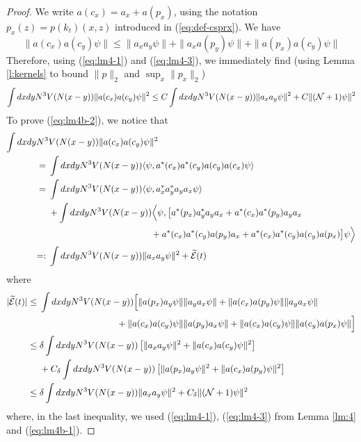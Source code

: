 \documentclass[11pt,a4paper,DIV11]{scrartcl}	%
\newcommand{\wt}{\widetilde}
\newcommand{\cE}{{\cal E}}
\newcommand{\cN}{{\cal N}}
\begin{document}
\begin{proof}
We write $a (c_x) = a_x + a (p_x)$, using the notation $p_x (z) = p (k_t) (x,z)$ introduced in (\ref{eq:def-csprx}). We have
\[ \| a (c_x) a (c_y) \psi \| \leq \| a_x a_y \psi \| + \| a_x a (p_y) \psi \| + \| a (p_x) a (c_y) \psi \| \] 
Therefore, using (\ref{eq:lm4-1}) and (\ref{eq:lm4-3}), we immediately find (using Lemma \ref{l:kernels} to bound $\| p \|_2$ and $\sup_x \| p_x \|_2$)
\[ \int dx dy N^3 V(N(x-y)) \| a(c_x) a(c_y) \psi \|^2 \leq C \int dx dy N^3 V (N (x-y)) \| a_x a_y \psi \|^2 + C \| (\cN+1) \psi \|^2 \]
To prove (\ref{eq:lm4b-2}), we notice that
\[ \begin{split} 
\int dx dy N^3 &V (N(x-y)) \| a (c_x) a(c_y) \psi \|^2 \\ = \; & \int dx dy N^3 V (N(x-y)) \langle \psi , a^* (c_x) a^* (c_y) a(c_y) a(c_x) \psi \rangle \\
= \; & \int dx dy N^3 V (N(x-y)) \langle \psi , a^*_x a^*_y a_y a_x \psi \rangle \\
&+\int dx dy N^3 V (N(x-y))  \Big\langle \psi , \big[ a^* (p_x) a^*_y a_y a_x + a^* (c_x) a^* (p_y) a_y a_x \\ &\hspace{4cm} + a^* (c_x) a^* (c_y) a (p_y) a_x + a^* (c_x) a^* (c_y) a (c_y) a(p_x) \big] \psi \Big\rangle \\
=: \; & \int dx dy N^3 V (N (x-y)) \| a_x a_y \psi \|^2 + \wt{\cE} (t) \end{split}\]
where
\[ \begin{split}
|\wt{\cE} (t)| \leq \; & \int dx dy N^3 V(N(x-y)) \Big[ \| a (p_x) a_y \psi \| \| a_y a_x \psi \| + \| a(c_x) a(p_y) \psi \| \| a_y a_x \psi \| \\ &\hspace{3cm} 
+ \| a (c_x) a (c_y) \psi \| \| a(p_y) a_x \psi \| + \| a (c_x) a(c_y) \psi \| \| a(c_y) a(p_x) \psi \| \Big]  \\ \leq\; & \delta \int dx dy N^3 V(N (x-y)) \left[ \| a_x a_y \psi \|^2 + \| a (c_x) a(c_y) \psi \|^2 \right] \\ &+ C_\delta \int dx dy N^3 V(N (x-y)) \left[ \| a(p_x) a_y \psi \|^2 + \| a(c_x) a(p_y) \psi \|^2 \right] 
\\ \leq \; & \delta \int dx dy N^3 V(N (x-y)) \| a_x a_y \psi \|^2 + C_\delta \| (\cN+1) \psi \|^2 \end{split} \]
where, in the last inequality, we used (\ref{eq:lm4-1}), (\ref{eq:lm4-3}) from Lemma \ref{lm:4} and 
(\ref{eq:lm4b-1}).
\end{proof}
\end{document}
